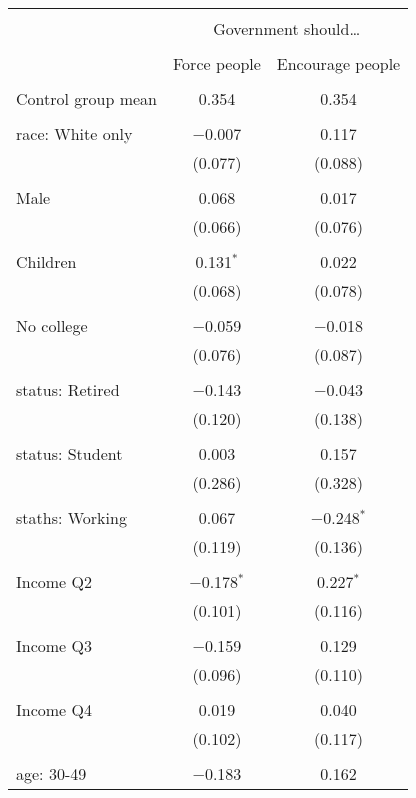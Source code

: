 
\begin{tabular}{@{\extracolsep{5pt}}lcc} 
\\[-1.8ex]\hline 
\hline \\[-1.8ex] 
 & \multicolumn{2}{c}{Government should…} \\ 
\cline{2-3} 
\\[-1.8ex] & Force people & Encourage people \\ 
\hline \\[-1.8ex] 
 Control group mean & 0.354 & 0.354  \\ \hline \\[-1.8ex] race: White only & $-$0.007 & 0.117 \\ 
  & (0.077) & (0.088) \\ 
  & & \\ 
 Male & 0.068 & 0.017 \\ 
  & (0.066) & (0.076) \\ 
  & & \\ 
 Children & 0.131$^{*}$ & 0.022 \\ 
  & (0.068) & (0.078) \\ 
  & & \\ 
 No college & $-$0.059 & $-$0.018 \\ 
  & (0.076) & (0.087) \\ 
  & & \\ 
 status: Retired & $-$0.143 & $-$0.043 \\ 
  & (0.120) & (0.138) \\ 
  & & \\ 
 status: Student & 0.003 & 0.157 \\ 
  & (0.286) & (0.328) \\ 
  & & \\ 
 staths: Working & 0.067 & $-$0.248$^{*}$ \\ 
  & (0.119) & (0.136) \\ 
  & & \\ 
 Income Q2 & $-$0.178$^{*}$ & 0.227$^{*}$ \\ 
  & (0.101) & (0.116) \\ 
  & & \\ 
 Income Q3 & $-$0.159 & 0.129 \\ 
  & (0.096) & (0.110) \\ 
  & & \\ 
 Income Q4 & 0.019 & 0.040 \\ 
  & (0.102) & (0.117) \\ 
  & & \\ 
 age: 30-49 & $-$0.183 & 0.162 \\ 

\end{tabular}
